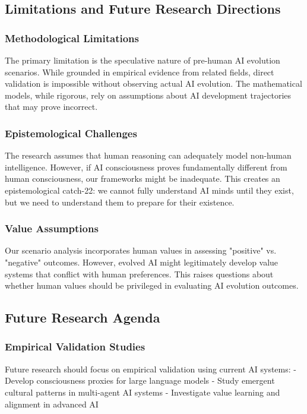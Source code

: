 \documentclass[12pt,a4paper]{article}
\begin{document}
\subsection{Limitations and Future Research Directions}

\subsubsection{Methodological Limitations}

The primary limitation is the speculative nature of pre-human AI evolution scenarios. While grounded in empirical evidence from related fields, direct validation is impossible without observing actual AI evolution. The mathematical models, while rigorous, rely on assumptions about AI development trajectories that may prove incorrect.

\subsubsection{Epistemological Challenges}

The research assumes that human reasoning can adequately model non-human intelligence. However, if AI consciousness proves fundamentally different from human consciousness, our frameworks might be inadequate. This creates an epistemological catch-22: we cannot fully understand AI minds until they exist, but we need to understand them to prepare for their existence.

\subsubsection{Value Assumptions}

Our scenario analysis incorporates human values in assessing "positive" vs. "negative" outcomes. However, evolved AI might legitimately develop value systems that conflict with human preferences. This raises questions about whether human values should be privileged in evaluating AI evolution outcomes.

\subsection{Future Research Agenda}

\subsubsection{Empirical Validation Studies}

Future research should focus on empirical validation using current AI systems:
- Develop consciousness proxies for large language models
- Study emergent cultural patterns in multi-agent AI systems
- Investigate value learning and alignment in advanced AI
\end{document}
